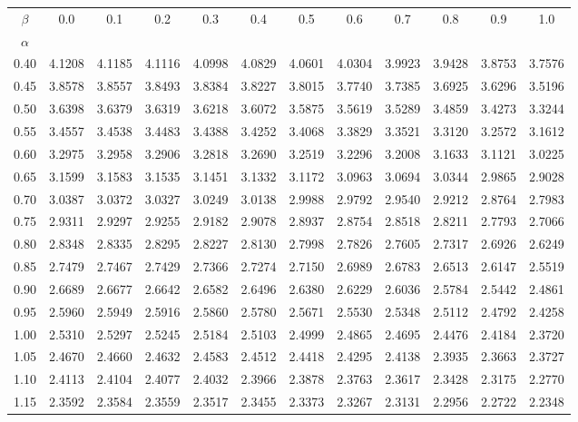 \begin{tabular}{cccccccccccc}
\toprule
$\beta$ & 0.0 & 0.1 & 0.2 & 0.3 & 0.4 & 0.5 & 0.6 & 0.7 & 0.8 & 0.9 & 1.0 \\
$\alpha$ &  &  &  &  &  &  &  &  &  &  &  \\
\midrule
0.40 & 4.1208 & 4.1185 & 4.1116 & 4.0998 & 4.0829 & 4.0601 & 4.0304 & 3.9923 & 3.9428 & 3.8753 & 3.7576 \\
0.45 & 3.8578 & 3.8557 & 3.8493 & 3.8384 & 3.8227 & 3.8015 & 3.7740 & 3.7385 & 3.6925 & 3.6296 & 3.5196 \\
0.50 & 3.6398 & 3.6379 & 3.6319 & 3.6218 & 3.6072 & 3.5875 & 3.5619 & 3.5289 & 3.4859 & 3.4273 & 3.3244 \\
0.55 & 3.4557 & 3.4538 & 3.4483 & 3.4388 & 3.4252 & 3.4068 & 3.3829 & 3.3521 & 3.3120 & 3.2572 & 3.1612 \\
0.60 & 3.2975 & 3.2958 & 3.2906 & 3.2818 & 3.2690 & 3.2519 & 3.2296 & 3.2008 & 3.1633 & 3.1121 & 3.0225 \\
0.65 & 3.1599 & 3.1583 & 3.1535 & 3.1451 & 3.1332 & 3.1172 & 3.0963 & 3.0694 & 3.0344 & 2.9865 & 2.9028 \\
0.70 & 3.0387 & 3.0372 & 3.0327 & 3.0249 & 3.0138 & 2.9988 & 2.9792 & 2.9540 & 2.9212 & 2.8764 & 2.7983 \\
0.75 & 2.9311 & 2.9297 & 2.9255 & 2.9182 & 2.9078 & 2.8937 & 2.8754 & 2.8518 & 2.8211 & 2.7793 & 2.7066 \\
0.80 & 2.8348 & 2.8335 & 2.8295 & 2.8227 & 2.8130 & 2.7998 & 2.7826 & 2.7605 & 2.7317 & 2.6926 & 2.6249 \\
0.85 & 2.7479 & 2.7467 & 2.7429 & 2.7366 & 2.7274 & 2.7150 & 2.6989 & 2.6783 & 2.6513 & 2.6147 & 2.5519 \\
0.90 & 2.6689 & 2.6677 & 2.6642 & 2.6582 & 2.6496 & 2.6380 & 2.6229 & 2.6036 & 2.5784 & 2.5442 & 2.4861 \\
0.95 & 2.5960 & 2.5949 & 2.5916 & 2.5860 & 2.5780 & 2.5671 & 2.5530 & 2.5348 & 2.5112 & 2.4792 & 2.4258 \\
1.00 & 2.5310 & 2.5297 & 2.5245 & 2.5184 & 2.5103 & 2.4999 & 2.4865 & 2.4695 & 2.4476 & 2.4184 & 2.3720 \\
1.05 & 2.4670 & 2.4660 & 2.4632 & 2.4583 & 2.4512 & 2.4418 & 2.4295 & 2.4138 & 2.3935 & 2.3663 & 2.3727 \\
1.10 & 2.4113 & 2.4104 & 2.4077 & 2.4032 & 2.3966 & 2.3878 & 2.3763 & 2.3617 & 2.3428 & 2.3175 & 2.2770 \\
1.15 & 2.3592 & 2.3584 & 2.3559 & 2.3517 & 2.3455 & 2.3373 & 2.3267 & 2.3131 & 2.2956 & 2.2722 & 2.2348 \\

\end{tabular}
